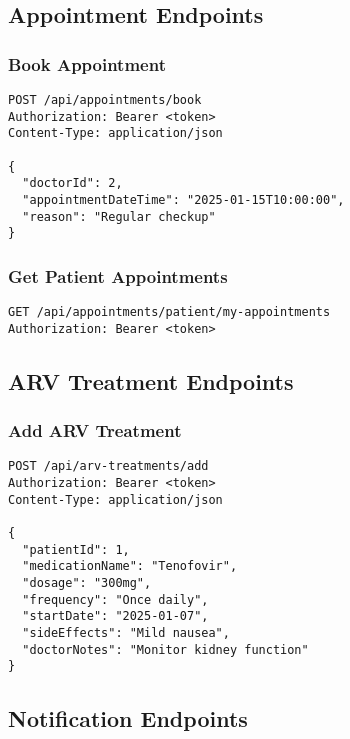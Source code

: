 \documentclass[12pt,a4paper]{article}
\begin{document}
\subsection{Appointment Endpoints}

\subsubsection{Book Appointment}

\begin{lstlisting}[language=HTTP, caption=Book Appointment Request]
POST /api/appointments/book
Authorization: Bearer <token>
Content-Type: application/json

{
  "doctorId": 2,
  "appointmentDateTime": "2025-01-15T10:00:00",
  "reason": "Regular checkup"
}
\end{lstlisting}

\subsubsection{Get Patient Appointments}

\begin{lstlisting}[language=HTTP, caption=Get Appointments Request]
GET /api/appointments/patient/my-appointments
Authorization: Bearer <token>
\end{lstlisting}

\subsection{ARV Treatment Endpoints}

\subsubsection{Add ARV Treatment}

\begin{lstlisting}[language=HTTP, caption=Add Treatment Request]
POST /api/arv-treatments/add
Authorization: Bearer <token>
Content-Type: application/json

{
  "patientId": 1,
  "medicationName": "Tenofovir",
  "dosage": "300mg",
  "frequency": "Once daily",
  "startDate": "2025-01-07",
  "sideEffects": "Mild nausea",
  "doctorNotes": "Monitor kidney function"
}
\end{lstlisting}

\subsection{Notification Endpoints}
\end{document}

